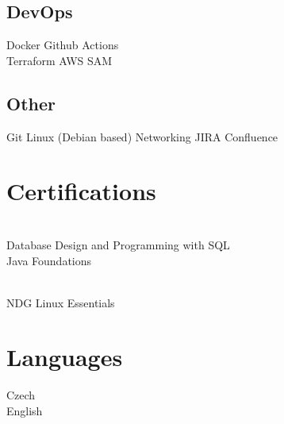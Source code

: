 \documentclass[]{plushcv}
\begin{document}
\begin{minipage}[t]{0.25\textwidth}
\subsection{DevOps}
\sectionsep
Docker \textbullet{} Github Actions \textbullet{} \\
Terraform \textbullet{} AWS SAM
\sectionsep

\subsection{Other}
\sectionsep
Git \textbullet{} Linux (Debian based) \textbullet{} Networking \textbullet{} JIRA \textbullet{} \mbox{Confluence}
\sectionsep


\section{Certifications}
 \\
Database Design and Programming with SQL \\
Java Foundations
\sectionsep

 \\
NDG Linux Essentials
\sectionsep


\section{Languages}
Czech \\
English

\end{minipage}
\end{document}
